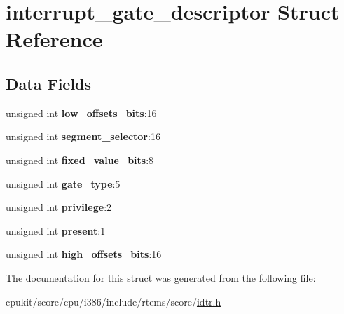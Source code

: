 \hypertarget{structinterrupt__gate__descriptor}{}\section{interrupt\+\_\+gate\+\_\+descriptor Struct Reference}
\label{structinterrupt__gate__descriptor}
\subsection*{Data Fields}
\begin{DoxyCompactItemize}
\item 
\mbox{\label{structinterrupt__gate__descriptor_aa00adb850ba4bfbbefb02821e27eda31}} 
unsigned int {\bfseries low\+\_\+offsets\+\_\+bits}\+:16
\item 
\mbox{\label{structinterrupt__gate__descriptor_a91f8e64857b4b2ba8456a3bd020d7e95}} 
unsigned int {\bfseries segment\+\_\+selector}\+:16
\item 
\mbox{\label{structinterrupt__gate__descriptor_ad66f150411d0a60894867aba0c3a5d6c}} 
unsigned int {\bfseries fixed\+\_\+value\+\_\+bits}\+:8
\item 
\mbox{\label{structinterrupt__gate__descriptor_a97099387c95e34783c3d784fcd693af1}} 
unsigned int {\bfseries gate\+\_\+type}\+:5
\item 
\mbox{\label{structinterrupt__gate__descriptor_aeef030781beb946dc6298c70023bd9bd}} 
unsigned int {\bfseries privilege}\+:2
\item 
\mbox{\label{structinterrupt__gate__descriptor_a41e91e9c8d2701ae43d1559ab9fe82bb}} 
unsigned int {\bfseries present}\+:1
\item 
\mbox{\label{structinterrupt__gate__descriptor_a0b4e61850c17f39263314fef47201793}} 
unsigned int {\bfseries high\+\_\+offsets\+\_\+bits}\+:16
\end{DoxyCompactItemize}


The documentation for this struct was generated from the following file\+:\begin{DoxyCompactItemize}
\item 
cpukit/score/cpu/i386/include/rtems/score/\mbox{\hyperlink{idtr_8h}{idtr.\+h}}\end{DoxyCompactItemize}
